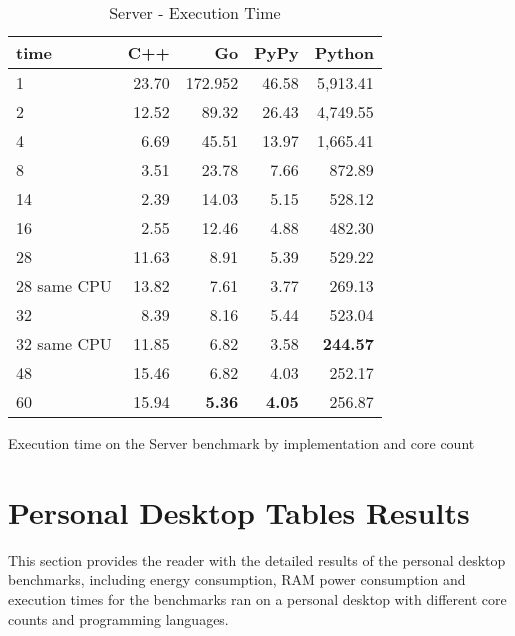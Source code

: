 \begin{table}[H]
    \centering
    \begin{tabular}{lrrrr}
        \hline
        time         & C++             & Go            & PyPy          & Python     \\
        \hline
        1            & 23.70           & 172.952       & 46.58         & 5,913.41        \\
        2            & 12.52           & 89.32         & 26.43         & 4,749.55        \\
        4            & 6.69            & 45.51         & 13.97         & 1,665.41        \\
        8	         & 3.51  	       & 23.78 	       & 7.66          & 872.89          \\
        14           & 2.39            & 14.03         & 5.15          & 528.12          \\
        16           & 2.55            & 12.46         & 4.88          & 482.30          \\
        28           & 11.63           & 8.91          & 5.39          & 529.22          \\
        28 same CPU  & 13.82           & 7.61          & 3.77          & 269.13          \\
        32           & 8.39            & 8.16          & 5.44          & 523.04          \\
        32 same CPU  & 11.85           & 6.82          & 3.58          & \textbf{244.57} \\
        48           & 15.46           & 6.82          & 4.03          & 252.17          \\
        60           & 15.94           & \textbf{5.36} & \textbf{4.05} & 256.87          \\
        \hline
    \end{tabular}
\caption{Server - Execution Time}{Execution time on the Server benchmark by implementation and core count}
\label{tab:server-execution-time}
\end{table}

\chapter{Personal Desktop Tables Results}

This section provides the reader with the detailed results of the personal desktop benchmarks, including energy consumption, RAM power consumption and execution times for the benchmarks ran on a personal desktop with different core counts and programming languages.

